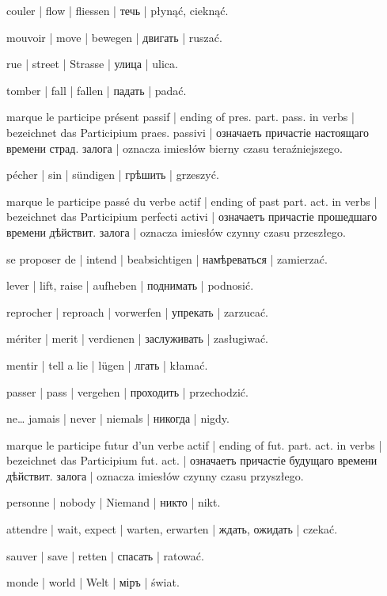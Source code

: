 \begin{ekzvocab}{1em}
 couler | flow | fliessen | течь | płynąć, cieknąć.

 mouvoir | move | bewegen | двигать | ruszać.

 rue | street | Strasse | улица | ulica.

 tomber | fall | fallen | падать | padać.

 marque le participe présent passif | ending of pres. part. pass. in verbs | bezeichnet das Participium praes. passivi | означаеть причастіе настоящаго времени страд. залога | oznacza imiesłów bierny czasu teraźniejszego.

 pécher | sin | sündigen | грѣшить | grzeszyć.

 marque le participe passé du verbe actif | ending of past part. act. in verbs | bezeichnet das Participium perfecti activi | означаетъ причастіе прошедшаго времени дѣйствит. залога | oznacza imiesłów czynny czasu przeszłego.

 se proposer de | intend | beabsichtigen | намѣреваться | zamierzać.

 lever | lift, raise | aufheben | поднимать | podnosić.

 reprocher | reproach | vorwerfen | упрекать | zarzucać.

 mériter | merit | verdienen | заслуживать | zasługiwać.

 mentir | tell a lie | lügen | лгать | kłamać.

 passer | pass | vergehen | проходить | przechodzić.

 ne\ldots{} jamais | never | niemals | никогда | nigdy.

 marque le participe futur d’un verbe actif | ending of fut. part. act. in verbs | bezeichnet das Participium fut. act. | означаетъ причастіе будущаго времени дѣйствит. залога | oznacza imiesłów czynny czasu przyszłego.

 personne | nobody | Niemand | никто | nikt.

 attendre | wait, expect | warten, erwarten | ждать, ожидать | czekać.

 sauver | save | retten | спасать | ratować.

 monde | world | Welt | міръ | świat.


\end{ekzvocab}
